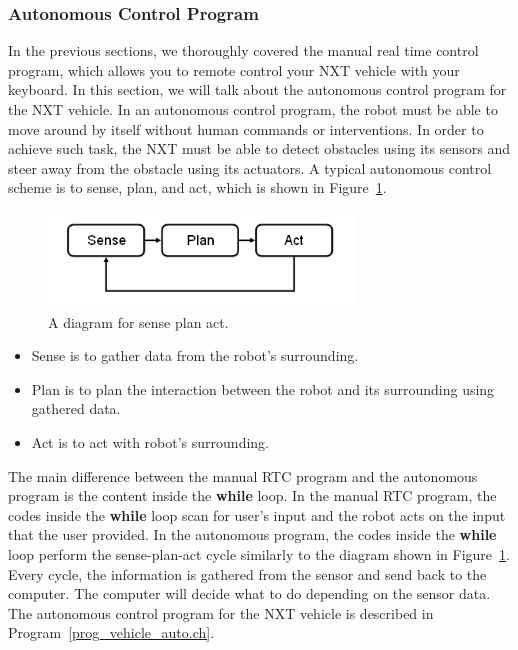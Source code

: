 \documentclass[11pt]{article}
\begin{document}
\subsubsection{Autonomous Control Program}
In the previous sections, we thoroughly covered the manual real time control 
program, which allows you to remote control your NXT vehicle with your keyboard.
In this section, we will talk about the autonomous control program for the NXT 
vehicle. In an autonomous control program, the robot must be able to move around 
by itself without human commands or interventions. In order to achieve such task, 
the NXT must be able to detect obstacles using its sensors and steer away from 
the obstacle using its actuators. A typical autonomous control scheme is to 
sense, plan, and act, which is shown in Figure~\ref{fig_NXT_SPA}.
\begin{figure}[h]
  \begin{center}
    \includegraphics[height=1in]{figure/mindstorm/Senseplanact.png}
    \caption{A diagram for sense plan act.\label{fig_NXT_SPA}}
  \end{center}
\end{figure}
\begin{itemize}
\item Sense is to gather data from the robot's surrounding.
\item Plan is to plan the interaction between the robot and its surrounding using 
    gathered data.
\item Act is to act with robot's surrounding.
\end{itemize}
The main difference between the manual RTC program and the autonomous program is 
the content inside the {\bf while} loop. In the manual RTC program, the codes inside 
the {\bf while} loop scan for user's input and the robot acts on the input that the 
user provided. In the autonomous program, the codes inside the {\bf while} loop 
perform the sense-plan-act cycle similarly to the diagram shown in Figure~\ref{fig_NXT_SPA}. 
Every cycle, the information is gathered from the sensor and send back to the computer. 
The computer will decide what to do depending on the sensor data. The autonomous 
control program for the NXT vehicle is described in Program~\ref{prog_vehicle_auto.ch}.
\end{document}
